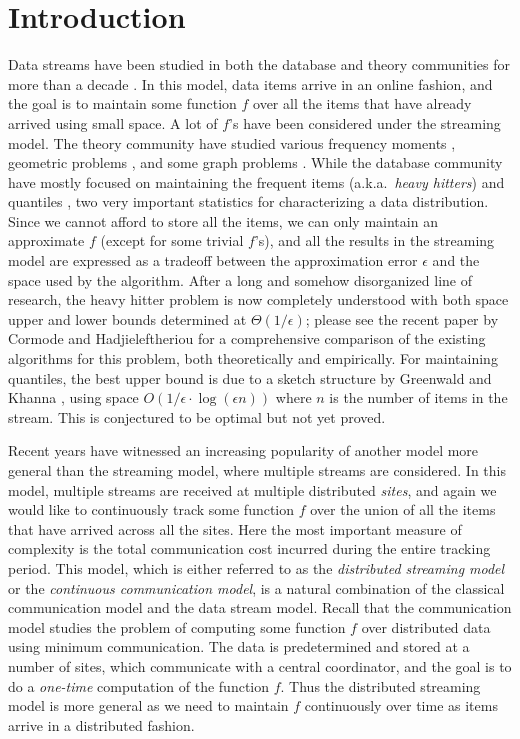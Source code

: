\documentclass[10pt]{article}
\newcommand{\eps}{\epsilon}
\begin{document}
\section{Introduction}
Data streams have been studied in both the database and theory communities
for more than a decade \cite{alon99,babcock02:_model_}.  In this model,
data items arrive in an online fashion, and the goal is to maintain some
function $f$ over all the items that have already arrived using small
space.  A lot of $f$'s have been considered under the streaming model.  The
theory community have studied various frequency moments
\cite{alon99,indyk05:_optim_,woodruff04:_optim_}, geometric problems
\cite{Indyk:04,suri04:_range,agarwal07:_space_}, and some graph problems
\cite{feigenbaum05:_graph_,bar-yossef02:_reduc}.  While the database
community have mostly focused on maintaining the frequent items (a.k.a.\
{\em heavy hitters})
\cite{cormode08:_findin,cormode03,karp03,metwally06,manku02:_approx} and
quantiles \cite{gilbert02:_how,cormode06:_space,greenwald01:_space}, two
very important statistics for characterizing a data distribution.  Since we
cannot afford to store all the items, we can only maintain an approximate
$f$ (except for some trivial $f$'s), and all the results in the streaming
model are expressed as a tradeoff between the approximation error $\eps$
and the space used by the algorithm.  After a long and somehow disorganized
line of research, the heavy hitter problem is now completely understood
with both space upper and lower bounds determined at $\Theta(1/\eps)$;
please see the recent paper by Cormode and Hadjieleftheriou
\cite{cormode08:_findin} for a comprehensive comparison of the existing
algorithms for this problem, both theoretically and empirically.  For
maintaining quantiles, the best upper bound is due to a sketch structure by
Greenwald and Khanna \cite{greenwald01:_space}, using space $O(1/\eps\cdot
\log(\eps n))$ where $n$ is the number of items in the stream.  This is
conjectured to be optimal but not yet proved.

Recent years have witnessed an increasing popularity of another model more
general than the streaming model, where multiple streams are considered.
In this model, multiple streams are received at multiple distributed {\em
  sites}, and again we would like to continuously track some function $f$
over the union of all the items that have arrived across all the sites.
Here the most important measure of complexity is the total communication
cost incurred during the entire tracking period.  This model, which is
either referred to as the {\em distributed streaming model} or the {\em
  continuous communication model}, is a natural combination of the
classical communication model \cite{yao79} and the data stream model.
Recall that the communication model studies the problem of computing some
function $f$ over distributed data using minimum communication.  The
data is predetermined and stored at a number of sites, which communicate
with a central coordinator, and the goal is to do a {\em one-time}
computation of the function $f$.  Thus the distributed streaming model is
more general as we need to maintain $f$ continuously over time as items
arrive in a distributed fashion.
\end{document}
